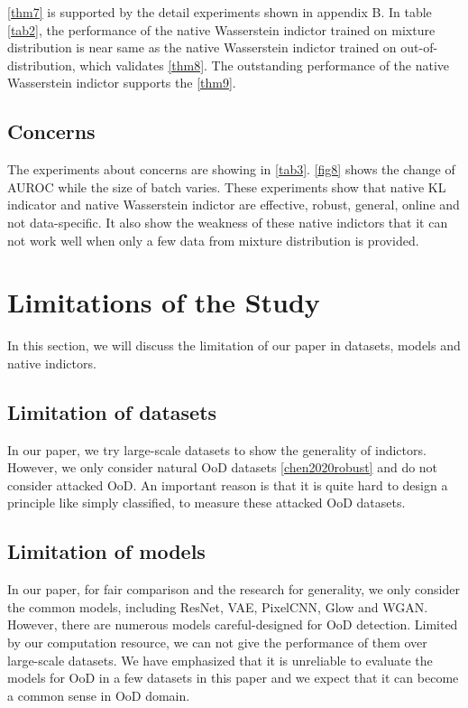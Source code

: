 \documentclass[letterpaper]{article} %
\begin{document}
\cref{thm7} is supported by the detail experiments shown in appendix B. In table \cref{tab2}, the performance of the native Wasserstein indictor trained on mixture distribution is near same as the native Wasserstein indictor trained on out-of-distribution, which validates \cref{thm8}. The outstanding performance of the native Wasserstein indictor supports the \cref{thm9}. 

\subsection{Concerns}

The experiments about concerns are showing in \cref{tab3}. \cref{fig8} shows the change of AUROC while the size of batch varies. These experiments show that native KL indicator and native Wasserstein indictor are effective, robust, general, online and not data-specific. It also show the weakness of these native indictors that it can not work well when only a few data from mixture distribution is provided. 

\section{Limitations of the Study} In this section, we will discuss the limitation of our paper in datasets, models and native indictors. 

\subsection{Limitation of datasets}
In our paper, we try large-scale datasets to show the generality of indictors. However, we only consider natural OoD datasets \cref{chen2020robust} and do not consider attacked OoD. An important reason is that it is quite hard to design a principle like simply classified, to measure these attacked OoD datasets. 

\subsection{Limitation of models} 
In our paper, for fair comparison and the research for generality, we only consider the common models, including ResNet, VAE, PixelCNN, Glow and WGAN. However, there are numerous models careful-designed for OoD detection. Limited by our computation resource, we can not give the performance of them over large-scale datasets. 
We have emphasized that it is unreliable to evaluate the models for OoD in a few datasets in this paper and we expect that it can become a common sense in OoD domain. 
\end{document}
